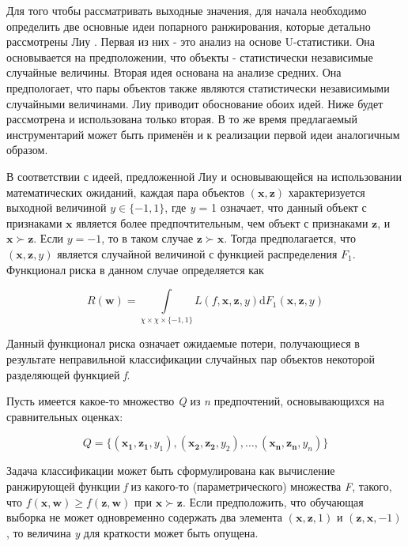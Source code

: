 \documentclass[12pt,a4paper,oneside]{article}
\begin{document}
\par
Для того чтобы рассматривать выходные значения, для начала необходимо определить две основные идеи попарного ранжирования, которые детально рассмотрены Лиу .
Первая из них - это анализ на основе U-статистики.
Она основывается на предположении, что объекты - статистически независимые случайные величины.
Вторая идея основана на анализе средних. 
Она предпологает, что пары объектов также являются статистически независимыми случайными величинами. 
Лиу приводит обоснование обоих идей. 
Ниже будет рассмотрена и использована только вторая. 
В то же время предлагаемый инструментарий может быть применён и к реализации первой идеи аналогичным образом. 

\par
В соответствии с идеей, предложенной Лиу  и основывающейся на использовании математических ожиданий, каждая пара объектов \((\mathbf{x}, \mathbf{z})\) характеризуется выходной величиной \(y \in \{-1,1\}\), где \emph{y} = 1 означает, что данный объект с признаками \(\mathbf{x}\) является более предпочтительным, чем объект с признаками \(\mathbf{z}\), и \(\mathbf{x} \succ \mathbf{z}\). Если \(y = -1\), то в таком случае \(\mathbf{z} \succ \mathbf{x}\). Тогда предполагается, что \((\mathbf{x}, \mathbf{z}, y)\) является случайной величиной с функцией распределения \(F_1\). Функционал риска в данном случае определяется как

\[
R(\mathbf{w}) = \int \limits_{\chi \times \chi \times \{-1, 1\}} L(f, \mathbf{x}, \mathbf{z}, y) \mathrm{d} F_1(\mathbf{x}, \mathbf{z}, y)
\]

\par

Данный функционал риска означает ожидаемые потери, получающиеся в результате неправильной классификации случайных пар объектов некоторой разделяющей функцией \emph{f}. 

\par
Пусть имеется какое-то множество \emph{Q} из \emph{n} предпочтений, основывающихся на сравнительных оценках:

\[
Q = \{(\mathbf{x_1}, \mathbf{z_1}, y_1), (\mathbf{x_2}, \mathbf{z_2}, y_2), \dots, (\mathbf{x_n}, \mathbf{z_n}, y_n)\}
\]

\par
Задача классификации может быть сформулирована как вычисление ранжирующей функции \emph{f} из какого-то (параметрического) множества \emph{F}, такого, что \(f(\mathbf{x}, \mathbf{w}) \geq f(\mathbf{z}, \mathbf{w})\) при \(\mathbf{x} \succ \mathbf{z}\). 
Если предположить, что обучающая выборка не может одновременно содержать два элемента \((\mathbf{x}, \mathbf{z}, 1)\) и \((\mathbf{z}, \mathbf{x}, -1)\), то величина \emph{y} для краткости может быть опущена. 
\end{document}
